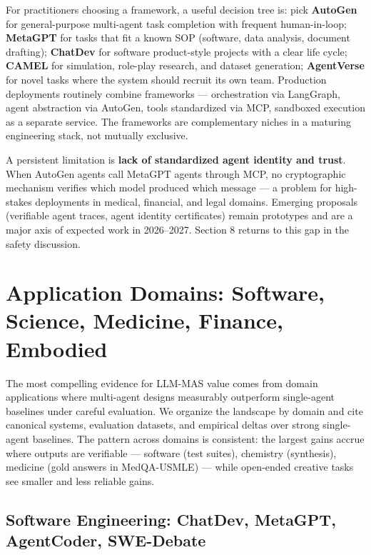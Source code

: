 \documentclass{article}
\begin{document}
For practitioners choosing a framework, a useful decision tree is: pick \textbf{AutoGen} for general-purpose multi-agent task completion with frequent human-in-loop; \textbf{MetaGPT} for tasks that fit a known SOP (software, data analysis, document drafting); \textbf{ChatDev} for software product-style projects with a clear life cycle; \textbf{CAMEL} for simulation, role-play research, and dataset generation; \textbf{AgentVerse} for novel tasks where the system should recruit its own team. Production deployments routinely combine frameworks --- orchestration via LangGraph, agent abstraction via AutoGen, tools standardized via MCP, sandboxed execution as a separate service. The frameworks are complementary niches in a maturing engineering stack, not mutually exclusive.

A persistent limitation is \textbf{lack of standardized agent identity and trust}. When AutoGen agents call MetaGPT agents through MCP, no cryptographic mechanism verifies which model produced which message --- a problem for high-stakes deployments in medical, financial, and legal domains. Emerging proposals (verifiable agent traces, agent identity certificates) remain prototypes and are a major axis of expected work in 2026--2027. Section 8 returns to this gap in the safety discussion.

\section{Application Domains: Software, Science, Medicine, Finance, Embodied}\label{application-domains-software-science-medicine-finance-embodied}

The most compelling evidence for LLM-MAS value comes from domain applications where multi-agent designs measurably outperform single-agent baselines under careful evaluation. We organize the landscape by domain and cite canonical systems, evaluation datasets, and empirical deltas over strong single-agent baselines. The pattern across domains is consistent: the largest gains accrue where outputs are verifiable --- software (test suites), chemistry (synthesis), medicine (gold answers in MedQA-USMLE) --- while open-ended creative tasks see smaller and less reliable gains.

\subsection{Software Engineering: ChatDev, MetaGPT, AgentCoder, SWE-Debate}\label{software-engineering-chatdev-metagpt-agentcoder-swe-debate}
\end{document}
